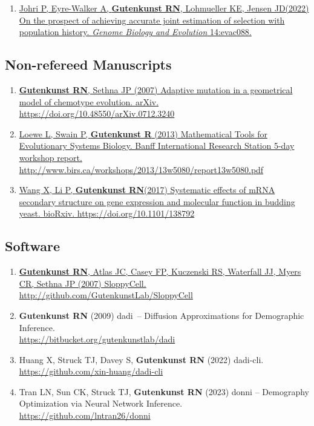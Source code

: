 \documentclass[11pt]{article}
\newcommand{\dadi}{dadi\xspace}
\begin{document}
\begin{enumerate}
\item \href{https://doi.org/10.1093/gbe/evac088}{Johri P\corresponding, Eyre-Walker A, \textbf{Gutenkunst RN}, Lohmueller KE, Jensen JD\corresponding (2022) On the prospect of achieving accurate joint estimation of selection with population history. \emph{Genome Biology and Evolution} 14:evac088.}


\end{enumerate}


\subsection*{Non-refereed Manuscripts}
\begin{enumerate}
\item \href{
https://doi.org/10.48550/arXiv.0712.3240}{\grad \textbf{Gutenkunst RN}, Sethna JP (2007) Adaptive mutation in a geometrical model of chemotype evolution. arXiv.
https://doi.org/10.48550/arXiv.0712.3240}

\item \href{http://www.birs.ca/workshops/2013/13w5080/report13w5080.pdf}{Loewe L, Swain P, \textbf{Gutenkunst R} (2013) Mathematical Tools for Evolutionary Systems Biology. Banff International Research Station 5-day workshop report.\\http://www.birs.ca/workshops/2013/13w5080/report13w5080.pdf}

\item \href{https://doi.org/10.1101/138792}{Wang X\trainee, Li P, \textbf{Gutenkunst RN}\corresponding (2017) Systematic effects of mRNA secondary structure on gene expression and molecular function in budding yeast. bioRxiv. https://doi.org/10.1101/138792}

\end{enumerate}

\subsection*{Software}
\begin{enumerate}

\item \href{http://github.com/GutenkunstLab/SloppyCell}{\grad \textbf{Gutenkunst RN}, Atlas JC, Casey FP, Kuczenski RS, Waterfall JJ, Myers CR, Sethna JP (2007) 
SloppyCell.} \url{http://github.com/GutenkunstLab/SloppyCell}

\item\textbf{Gutenkunst RN} (2009)
\dadi\ -- Diffusion Approximations for Demographic Inference. \\ \url{https://bitbucket.org/gutenkunstlab/dadi}

\item Huang X\trainee, Struck TJ\trainee, Davey S, \textbf{Gutenkunst RN} (2022) dadi-cli.\\ \url{https://github.com/xin-huang/dadi-cli}

\item Tran LN\trainee, Sun CK\trainee, Struck TJ\trainee, \textbf{Gutenkunst RN} (2023) donni -- Demography Optimization via Neural Network Inference. \url{https://github.com/lntran26/donni}

\end{enumerate}
\end{document}
